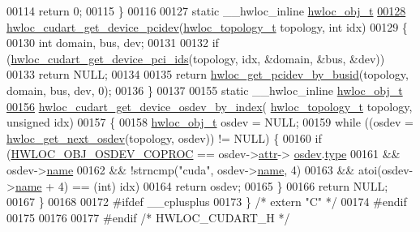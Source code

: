 \begin{DoxyCode}
00114   \textcolor{keywordflow}{return} 0;
00115 \}
00116 
00127 \textcolor{keyword}{static} \_\_hwloc\_inline \hyperlink{a00238}{hwloc\_obj\_t}
\hyperlink{a00220_gaeda4e6efbb36b518b2c286434ad23bb2}{00128} \hyperlink{a00220_gaeda4e6efbb36b518b2c286434ad23bb2}{hwloc\_cudart\_get\_device\_pcidev}(\hyperlink{a00186_ga9d1e76ee15a7dee158b786c30b6a6e38}{hwloc\_topology\_t} topology, \textcolor{keywordtype}{int}
       idx)
00129 \{
00130   \textcolor{keywordtype}{int} domain, bus, dev;
00131 
00132   \textcolor{keywordflow}{if} (\hyperlink{a00220_gad8b701d9a34923e34bd58defd4c1e704}{hwloc\_cudart\_get\_device\_pci\_ids}(topology, idx, &domain, &bus, &dev))
00133     \textcolor{keywordflow}{return} NULL;
00134 
00135   \textcolor{keywordflow}{return} \hyperlink{a00204_gacdbaf0db98872e224b7883a84bfb0455}{hwloc\_get\_pcidev\_by\_busid}(topology, domain, bus, dev, 0);
00136 \}
00137 
00155 \textcolor{keyword}{static} \_\_hwloc\_inline \hyperlink{a00238}{hwloc\_obj\_t}
\hyperlink{a00220_gac0f3eeaf7712919f298097b1a21307b0}{00156} \hyperlink{a00220_gac0f3eeaf7712919f298097b1a21307b0}{hwloc\_cudart\_get\_device\_osdev\_by\_index}(
      \hyperlink{a00186_ga9d1e76ee15a7dee158b786c30b6a6e38}{hwloc\_topology\_t} topology, \textcolor{keywordtype}{unsigned} idx)
00157 \{
00158         \hyperlink{a00238}{hwloc\_obj\_t} osdev = NULL;
00159         \textcolor{keywordflow}{while} ((osdev = \hyperlink{a00204_ga8b4584c8949e2c5f1c97ba7fe92b8145}{hwloc\_get\_next\_osdev}(topology, osdev)) != NULL) \{
00160                 \textcolor{keywordflow}{if} (\hyperlink{a00184_gga64f5d539df299c97ae80ce53fc4b56c0a46f8927e1c3e137eaa86cc8f6861fb83}{HWLOC\_OBJ\_OSDEV\_COPROC} == osdev->\hyperlink{a00238_accd40e29f71f19e88db62ea3df02adc8}{attr}->
      \hyperlink{a00242_a22904c25fe44b323bab5c9bc52660fca}{osdev}.\hyperlink{a00282_a31e019e27e54ac6138d04be639bb96f9}{type}
00161                     && osdev->\hyperlink{a00238_abb709ec38f2970677e4e57d1d30be96d}{name}
00162                     && !strncmp(\textcolor{stringliteral}{"cuda"}, osdev->\hyperlink{a00238_abb709ec38f2970677e4e57d1d30be96d}{name}, 4)
00163                     && atoi(osdev->\hyperlink{a00238_abb709ec38f2970677e4e57d1d30be96d}{name} + 4) == (\textcolor{keywordtype}{int}) idx)
00164                         \textcolor{keywordflow}{return} osdev;
00165         \}
00166         \textcolor{keywordflow}{return} NULL;
00167 \}
00168 
00172 \textcolor{preprocessor}{#ifdef \_\_cplusplus}
00173 \} \textcolor{comment}{/* extern "C" */}
00174 \textcolor{preprocessor}{#endif}
00175 
00176 
00177 \textcolor{preprocessor}{#endif }\textcolor{comment}{/* HWLOC\_CUDART\_H */}\textcolor{preprocessor}{}
\end{DoxyCode}
